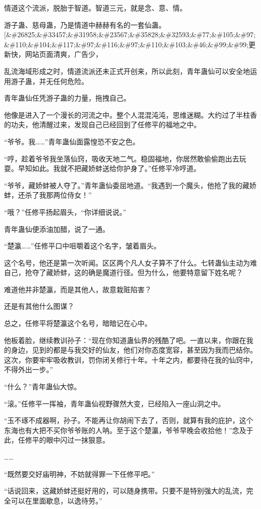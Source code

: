 \begin{this_body}
情道这个流派，脱胎于智道。智道三元，就是念、意、情。

游子蛊、慈母蛊，乃是情道中赫赫有名的一套仙蛊。[\&\#26825;\&\#33457;\&\#31958;\&\#23567;\&\#35828;\&\#32593;\&\#77;\&\#105;\&\#97;\&\#110;\&\#104;\&\#117;\&\#97;\&\#116;\&\#97;\&\#110;\&\#103;\&\#46;\&\#99;\&\#99;更新快，网站页面清爽，广告少，

乱流海域形成之时，情道流派还未正式开创来，所以此刻，青年蛊仙可以安全地运用游子蛊，并无任何危险。

青年蛊仙任凭游子蛊的力量，拖拽自己。

他像是进入了一个漫长的河流之中。整个人混混沌沌，思维迷糊。大约过了半柱香的功夫，他清醒过来，发现自己已经回到了任修平的福地之中。

“爷爷。我……”青年蛊仙面露惶恐不安之色。

“哼，趁着爷爷我坐落仙窍，吸收天地二气。稳固福地，你居然敢偷偷跑出去玩耍。早知如此。我就不把藏娇蚌送给你护身了。”任修平冷哼道。

“爷爷，藏娇蚌被人夺了。”青年蛊仙委屈地道。“我遇到一个魔头，他抢了我的藏娇蚌，还杀了我那两位侍女！”

“哦？”任修平扬起眉头，“你详细说说。”

青年蛊仙便添油加醋，说了一通。

“楚瀛……”任修平口中咀嚼着这个名字，皱着眉头。

这个名号，他还是第一次听闻。区区两个凡人女子算不了什么。七转蛊仙主动为难自己，抢夺了藏娇蚌，这的确是魔道行径。但为什么，他要特意留下姓名呢？

难道他并非楚瀛，而是其他人，故意栽赃陷害？

还是有其他什么图谋？

总之，任修平将楚瀛这个名号，暗暗记在心中。

他板着脸，继续教训孙子：“现在你知道蛊仙界的残酷了吧。一直以来，你跟在我的身边，见到的都是与我交好的仙友，他们对你态度宽容，甚至因为我而巴结你。这次，你要牢牢吸收教训，罚你闭关修行十年。十年之内，都要待在我的仙窍中，不得外出一步。”

“什么？”青年蛊仙大惊。

“滚。”任修平一挥袖，青年蛊仙视野骤然大变，已经陷入一座山洞之中。

“玉不琢不成器啊，孙子。不能再让你胡闹下去了，否则，就算有我的庇护，这个东海也有大把不买你爷爷账的人呐。至于这个楚瀛，爷爷早晚会收拾他！”念及于此，任修平的眼中闪过一抹狠意。

……

“既然要交好庙明神，不妨就得罪一下任修平吧。”

“话说回来，这藏娇蚌还挺好用的，可以随身携带。只要不是特别强大的乱流，完全可以在里面歇息，以逸待劳。”


\end{this_body}
